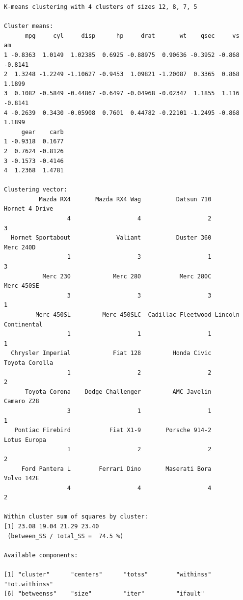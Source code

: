 \documentclass[12pt,brazil,oneside]{book}
\newenvironment{Shaded}{\begin{snugshade}}{\end{snugshade}}
\newcommand{\DataTypeTok}[1]{\textcolor[rgb]{0.13,0.29,0.53}{#1}}
\newcommand{\KeywordTok}[1]{\textcolor[rgb]{0.13,0.29,0.53}{\textbf{#1}}}
\newcommand{\NormalTok}[1]{#1}
\newcommand{\OperatorTok}[1]{\textcolor[rgb]{0.81,0.36,0.00}{\textbf{#1}}}
\begin{document}
\begin{verbatim}
K-means clustering with 4 clusters of sizes 12, 8, 7, 5

Cluster means:
      mpg     cyl     disp      hp     drat       wt    qsec     vs      am
1 -0.8363  1.0149  1.02385  0.6925 -0.88975  0.90636 -0.3952 -0.868 -0.8141
2  1.3248 -1.2249 -1.10627 -0.9453  1.09821 -1.20087  0.3365  0.868  1.1899
3  0.1082 -0.5849 -0.44867 -0.6497 -0.04968 -0.02347  1.1855  1.116 -0.8141
4 -0.2639  0.3430 -0.05908  0.7601  0.44782 -0.22101 -1.2495 -0.868  1.1899
     gear    carb
1 -0.9318  0.1677
2  0.7624 -0.8126
3 -0.1573 -0.4146
4  1.2368  1.4781

Clustering vector:
          Mazda RX4       Mazda RX4 Wag          Datsun 710      Hornet 4 Drive 
                  4                   4                   2                   3 
  Hornet Sportabout             Valiant          Duster 360           Merc 240D 
                  1                   3                   1                   3 
           Merc 230            Merc 280           Merc 280C          Merc 450SE 
                  3                   3                   3                   1 
         Merc 450SL         Merc 450SLC  Cadillac Fleetwood Lincoln Continental 
                  1                   1                   1                   1 
  Chrysler Imperial            Fiat 128         Honda Civic      Toyota Corolla 
                  1                   2                   2                   2 
      Toyota Corona    Dodge Challenger         AMC Javelin          Camaro Z28 
                  3                   1                   1                   1 
   Pontiac Firebird           Fiat X1-9       Porsche 914-2        Lotus Europa 
                  1                   2                   2                   2 
     Ford Pantera L        Ferrari Dino       Maserati Bora          Volvo 142E 
                  4                   4                   4                   2 

Within cluster sum of squares by cluster:
[1] 23.08 19.04 21.29 23.40
 (between_SS / total_SS =  74.5 %)

Available components:

[1] "cluster"      "centers"      "totss"        "withinss"     "tot.withinss"
[6] "betweenss"    "size"         "iter"         "ifault"      
\end{verbatim}

\begin{Shaded}
\end{Shaded}
\end{document}
